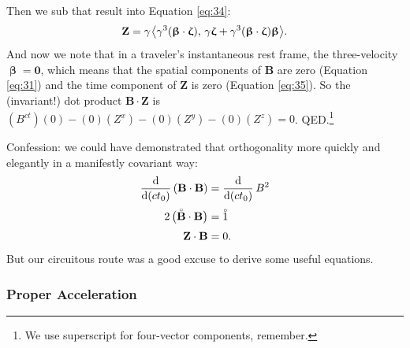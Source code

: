 \documentclass[12pt]{article}
\renewcommand{\mathring}[1]{\accentset{\circ}{#1}}
\renewcommand{\vv}[1]{\mathbf{#1}}
\newcommand{\dd}[1]{\mathrm{d}#1}
\newcommand{\vvbeta}{\bm{\upbeta}}
\newcommand{\vvzeta}{\bm{\upzeta}}
\begin{document}
Then we sub that result into Equation \ref{eq:34}:
\begin{equation}\label{eq:35}
\vv Z =\gamma \mkern1.5mu \big \langle \gamma^3 (\vvbeta \cdot \vvzeta), \, \gamma \vvzeta + \gamma^3 (\vvbeta \cdot \vvzeta) \vvbeta \big \rangle.
\end{equation}
And now we note that in a traveler's instantaneous rest frame, the three-velocity $\vvbeta = \vv 0$, which means that the spatial components of $\vv B$ are zero (Equation \ref{eq:31}) and the time component of $\vv Z$ is zero (Equation \ref{eq:35}). So the (invariant!) dot product $\vv B \cdot \vv Z$ is $(B^{ct})(0) - (0)(Z^x) - (0)(Z^y) - (0)(Z^z) = 0$. QED.\footnote{We use superscript for four-vector components, remember.}

Confession: we could have demonstrated that orthogonality more quickly and elegantly in a manifestly covariant way:
\begin{equation*}
\begin{split}
\dfrac{\dd}{\dd (ct_0)} \left( \vv B \cdot \vv B \right) &= \dfrac{\dd}{\dd (c t_0)} \, B^2 \\[2pt]
2 \, \big( \mathring{\vv B} \cdot \vv B \big) &= \mathring{1} \\[3pt]
\vv Z \cdot \vv B &= 0 .
\end{split}
\end{equation*}
But our circuitous route was a good excuse to derive some useful equations.


\subsubsection{Proper Acceleration}\label{sssec:pa}
\end{document}
